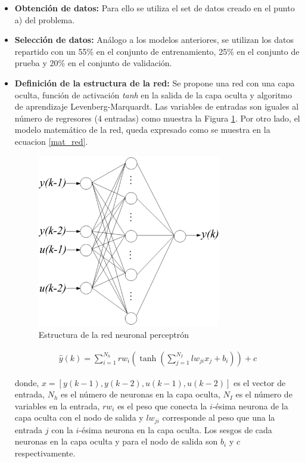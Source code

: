 \documentclass[12pt]{article}
\begin{document}
\begin{itemize}
	\item \textbf{Obtención de datos:} Para ello se utiliza el set de datos creado en el punto a) del problema.
	\item \textbf{Selección de datos:} Análogo a los modelos anteriores, se utilizan los datos repartido con un 55\% en el conjunto de entrenamiento, 25\% en el conjunto de prueba y 20\% en el conjunto de validación.
	\item \textbf{Definición de la estructura de la red:} Se propone una red con una capa oculta, función de activación \textit{tanh} en la salida de la capa oculta y algoritmo de aprendizaje Levenberg-Marquardt. Las variables de entradas son iguales al número de regresores (4 entradas) como muestra la Figura \ref{estred}. Por otro lado, el modelo matemático de la red, queda expresado como se muestra en la ecuacion \ref{mat_red}.
	\begin{figure}
		\centering
		\includegraphics[width=8cm]{imag/redes/estructura.eps}
		\caption{Estructura de la red neuronal perceptrón}
		\label{estred}
	\end{figure}
	\begin{align}
	\hat{y}(k) = \sum_{i=1}^{N_h} rw_i \left( \tanh\left(\sum_{j=1}^{N_I} lw_{ji} x_j + b_i\right)\right) + c
	\label{mat_red}
	\end{align}
	
	donde, $x = [y(k-1), y(k-2), u(k-1), u(k-2)]$ es el vector de entrada, $N_h$ es el número de neuronas en la capa oculta, $N_I$ es el número de variables en la entrada, $rw_i$ es el peso que conecta la $i$-ésima neurona de la capa oculta con el nodo de salida y $lw_{ji}$ corresponde al peso que una la entrada $j$ con la $i$-ésima neurona en la capa oculta. Los sesgos de cada neuronas en la capa oculta y para el nodo de salida son $b_i$ y $c$ respectivamente.   
	

\end{itemize}
\end{document}
